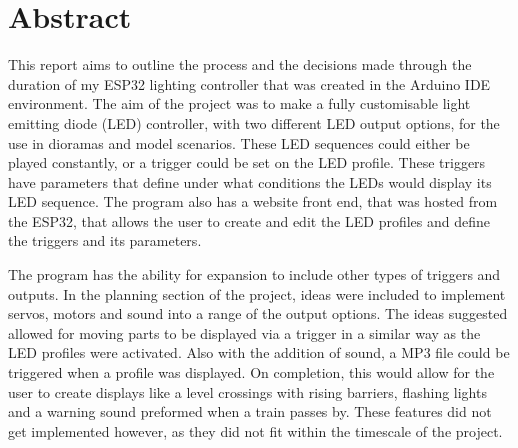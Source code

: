 \thispagestyle{empty}


\section*{\centering Abstract}

This report aims to outline the process and the decisions made through the duration of my ESP32 lighting controller that was created in the Arduino IDE environment. The aim of the project was to make a fully customisable light emitting diode (LED) controller, with two different LED output options, for the use in dioramas and model scenarios. These LED sequences could either be played constantly, or a trigger could be set on the LED profile. These triggers have  parameters that define under what conditions the LEDs would display its LED sequence. The program also has a website front end, that was hosted from the ESP32, that allows the user to create and edit the LED profiles and define the triggers and its parameters.

The program has the ability for expansion to include other types of triggers and outputs. In the planning section of the project, ideas were included to implement servos, motors and sound into a range of the output options. The ideas suggested allowed for moving parts to be displayed via a trigger in a similar way as the LED profiles were activated. Also with the addition of sound, a MP3 file could be triggered when a profile was displayed. On completion, this would allow for the user to create displays like a level crossings with rising barriers, flashing lights and a warning sound preformed when a train passes by. These features did not get implemented however, as they did not fit within the timescale of the project. 


